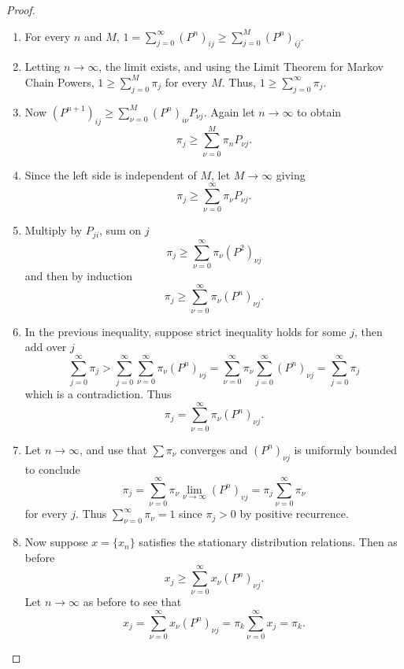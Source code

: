 \documentclass[12pt]{article}
\begin{document}
\begin{proof}
    \begin{enumerate}
        \item
            For every \( n \) and \( M \), \( 1 = \sum_{j=0}^{\infty} (P^n)_
            {ij} \ge \sum_{j=0}^M (P^n)_{ij} \).
        \item
            Letting \( n \to \infty \), the limit exists, and using the
            Limit Theorem for Markov Chain Powers, \( 1 \ge \sum_{j=0}^{M}
            \pi_j \) for every \( M \).  Thus, \( 1 \ge \sum_{j=0}^{\infty}
            \pi_j \).
        \item
            Now \( (P^{n+1})_{ij} \ge \sum_{\nu=0}^M (P^n)_{i \nu}P_{\nu
            j} \).  Again let \( n \to \infty \) to obtain
            \[
                \pi_j \ge \sum\limits_{\nu=0}^M \pi_{n} P_{\nu j}.
            \]
        \item
            Since the left side is independent of \( M \), let \( M \to
            \infty \) giving
            \[
                \pi_j \ge \sum\limits_{\nu=0}^\infty \pi_\nu P_{\nu j}.
            \]
        \item
            Multiply by \( P_{ji} \), sum on \( j \)
            \[
                \pi_j \ge \sum\limits_{\nu=0}^\infty \pi_{\nu} (P^2)_{\nu
                j}
            \] and then by induction
            \[
                \pi_j \ge \sum\limits_{\nu=0}^\infty \pi_\nu (P^n)_{\nu
                j}.
            \]
        \item
            In the previous inequality, suppose strict inequality holds
            for some \( j \), then add over \( j \)
            \[
                \sum\limits_{j=0}^{\infty} \pi_j > \sum\limits_{j=0}^{\infty}
                \sum\limits_{\nu=0}^{\infty} \pi_{\nu} (P^n)_{\nu j} =
                \sum\limits_ {\nu=0}^{\infty} \pi_\nu \sum\limits_{j=0}^
                {\infty}(P^n)_{\nu j} = \sum\limits_{j=0}^{\infty} \pi_j
            \] which is a contradiction.  Thus
            \[
                \pi_j = \sum\limits_{\nu=0}^\infty \pi_\nu (P^n)_{\nu j}.
            \]
        \item
            Let \( n \to \infty \), and use that \( \sum \pi_{\nu} \)
            converges and \( (P^n)_{\nu j} \) is uniformly bounded to
            conclude
            \[
                \pi_j = \sum\limits_{\nu=0}^{\infty} \pi_\nu \lim_{\nu
                \to \infty} (P^n)_{vj} = \pi_j \sum\limits_{\nu=0}^{\infty}
                \pi_{\nu}
            \] for every \( j \).  Thus \( \sum\limits_{\nu=0}^{\infty}
            \pi_{\nu} = 1 \) since \( \pi_j > 0 \) by positive
            recurrence.
        \item
            Now suppose \( x = \{x_n\} \) satisfies the stationary
            distribution relations.  Then as before
            \[
                x_j \ge \sum\limits_{\nu=0}^\infty x_\nu (P^n)_{\nu j}.
            \] Let \( n \to \infty \) as before to see that
            \[
                x_j = \sum\limits_{\nu =0}^{\infty} x_{\nu} (P^n)_{\nu j}
                = \pi_k \sum\limits_{\nu=0}^{\infty} x_j = \pi_k.
            \]
    \end{enumerate}
\end{proof}
\end{document}
